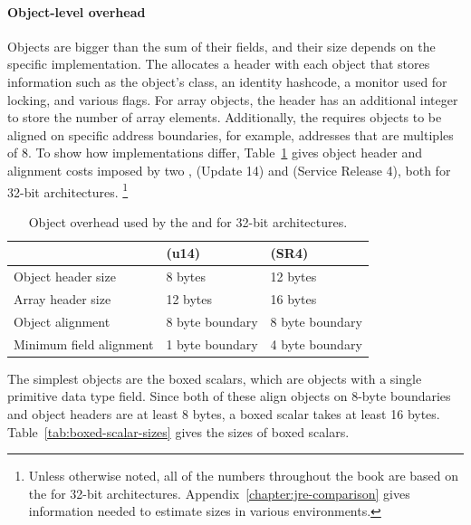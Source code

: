 \paragraph{Object-level overhead} Objects are bigger than the sum of their
fields, and their size depends on the specific \jre implementation. The \jre allocates a header with each object that
stores information such as the object's class, an identity hashcode, a monitor
used for locking, and various flags. For array objects, the header has an
additional integer to store the number of array elements. Additionally,  the
\jre requires objects to be aligned on specific address boundaries, for example,
addresses that are multiples of 8. To show how implementations differ,
Table~\ref{tab:object-overhead} gives object header and alignment costs imposed
by two \jres, \oracle \javasix (Update 14) and \ibm \javasix (Service Release 4),
both for 32-bit architectures. \footnote{Unless otherwise noted, all of the
numbers throughout the book are based on the \oracle \jre for 32-bit architectures.
Appendix~\ref{chapter:jre-comparison} gives information needed to estimate
sizes in various environments.}
\begin{table}
  \centering
 \begin{tabular}{lll} \toprule
 	& \oracle \javasix (u14) & \ibm \javasix (SR4) \\ \midrule
 	Object header size & 8 bytes & 12 bytes \\
 	Array header size & 12 bytes & 16 bytes \\
 	Object alignment & 8 byte boundary & 8 byte boundary \\
 	Minimum field alignment & 1 byte boundary & 4 byte boundary \\
 	\bottomrule
 \end{tabular}
  \caption{Object overhead used by the \oracle and \ibm \jres for 32-bit architectures.}
  \label{tab:object-overhead}
\end{table} 
   
The simplest objects are the boxed scalars, which are objects with a single
primitive data type field. Since both of these \jres align objects on
8-byte boundaries and object headers are at least 8 bytes, a boxed scalar takes
at least 16 bytes. Table~\ref{tab:boxed-scalar-sizes} gives the sizes of boxed
scalars.

